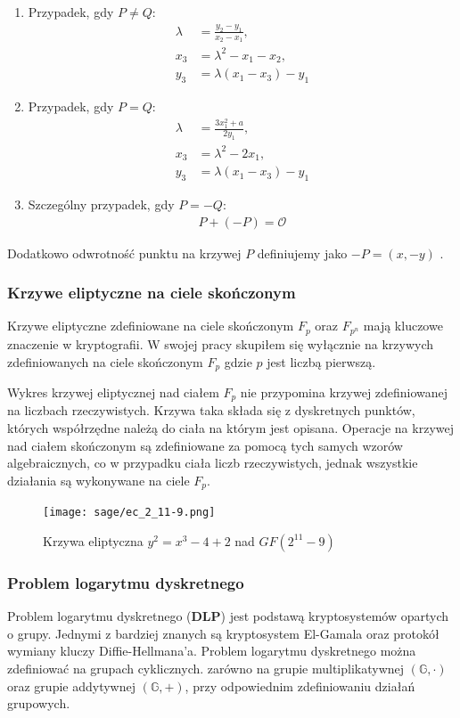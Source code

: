 \begin{enumerate}
    \item Przypadek, gdy \( P \neq Q \):
          \begin{align}
              \lambda & = \frac{y_2 - y_1}{x_2 - x_1}, \\
              x_3     & = \lambda^2 - x_1 - x_2,       \\
              y_3     & = \lambda(x_1 - x_3) - y_1
          \end{align}
    \item Przypadek, gdy \( P = Q \):
          \begin{align*}
              \lambda & = \frac{3x_1^2 + a}{2y_1}, \\
              x_3     & = \lambda^2 - 2x_1,        \\
              y_3     & = \lambda(x_1 - x_3) - y_1
          \end{align*}
    \item Szczególny przypadek, gdy \( P = -Q \):
          \begin{align*}
              P + (-P) = \mathcal{O}
          \end{align*}
\end{enumerate}
Dodatkowo odwrotność punktu na krzywej $P$ definiujemy jako $-P = (x, -y)$ \cite{Stinson2021}.


\subsubsection{Krzywe eliptyczne na ciele skończonym}
Krzywe eliptyczne zdefiniowane na ciele skończonym $F_p$ oraz $F_{p^n}$ mają kluczowe znaczenie w kryptografii.
W swojej pracy skupiłem się wyłącznie na krzywych zdefiniowanych na ciele skończonym $F_p$ gdzie $p$ jest liczbą pierwszą.
\par
Wykres krzywej eliptycznej nad ciałem $F_p$ nie przypomina krzywej zdefiniowanej na liczbach rzeczywistych.
Krzywa taka składa się z dyskretnych punktów, których współrzędne należą do ciała
na którym jest opisana.
Operacje na krzywej nad ciałem skończonym są zdefiniowane
za pomocą tych samych wzorów algebraicznych, co w przypadku ciała liczb rzeczywistych,
jednak wszystkie działania są wykonywane na ciele $F_p$.
\begin{figure}[!h]
    \centering \texttt{[image: sage/ec\_2\_11-9.png]}
    \caption{Krzywa eliptyczna $y^2=x^3-4+2$ nad $GF(2^{11} - 9)$}
\end{figure}


\subsubsection{Problem logarytmu dyskretnego}
Problem logarytmu dyskretnego (\textbf{DLP}) jest
podstawą kryptosystemów opartych o grupy.
Jednymi z bardziej znanych są kryptosystem El-Gamala oraz protokół wymiany
kluczy Diffie-Hellmana'a.
Problem logarytmu dyskretnego można zdefiniować na grupach cyklicznych.
zarówno na grupie multiplikatywnej $(\mathbb{G},\cdot)$
oraz grupie addytywnej $(\mathbb{G}, +)$, przy odpowiednim zdefiniowaniu działań grupowych.

